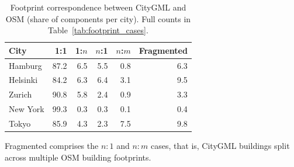 \documentclass[sigconf,authordraft]{acmart}
\begin{document}
\begin{table}[h!]
  \caption{Footprint correspondence between CityGML and OSM (share of
  components per city). Full counts in Table~\ref{tab:footprint_cases}.}
  \label{tab:footprint_cases_lite}
  \begin{tabular}{lrrrrr}
    \toprule
    City & 1:1 & 1:$n$ & $n$:1 & $n$:$m$ & Fragmented \\
    \midrule
    Hamburg  & 87.2 & 6.5 & 5.5 & 0.8 & 6.3 \\
    Helsinki & 84.2 & 6.3 & 6.4 & 3.1 & 9.5 \\
    Zurich   & 90.8 & 5.8 & 2.4 & 0.9 & 3.3 \\
    New York & 99.3 & 0.3 & 0.3 & 0.1 & 0.4 \\
    Tokyo    & 85.9 & 4.3 & 2.3 & 7.5 & 9.8 \\
    \bottomrule
  \end{tabular}
  
  \smallskip\raggedright\footnotesize
  Fragmented comprises the \(n{:}1\) and \(n{:}m\) cases, that is, CityGML buildings split across multiple OSM building footprints. 
\end{table}
\end{document}
